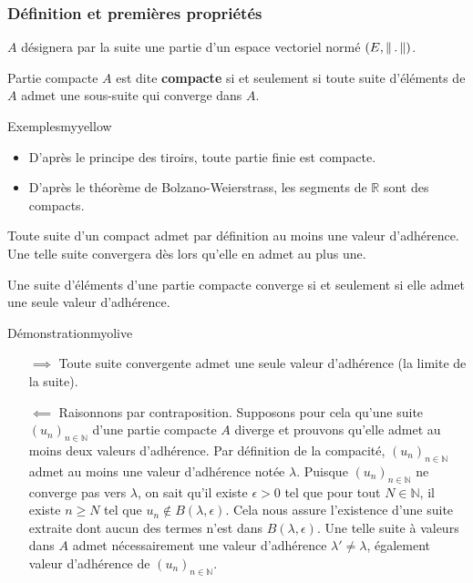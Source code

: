    \subsubsection{Définition et premières propriétés}

    $A$ désignera par la suite une partie d’un espace vectoriel normé $\left(E, \left\lVert\,.\,\right\rVert\right)$.

    \begin{defi}{Partie compacte}{}
        $A$ est dite \textbf{compacte} si et seulement si toute suite d’éléments de $A$ admet une sous-suite qui converge dans $A$.
    \end{defi}

    \begin{omed}{Exemples}{myyellow}
        \begin{itemize}
            \item D’après le principe des tiroirs, toute partie finie est compacte.
            \item D’après le théorème de Bolzano-Weierstrass, les segments de $\mathbb{R}$ sont des compacts.
        \end{itemize}
    \end{omed}

    Toute suite d’un compact admet par définition au moins une valeur d’adhérence. Une telle suite convergera dès lors qu’elle en admet au plus une.

    \begin{prop}{}{}
        Une suite d’éléments d’une partie compacte converge si et seulement si elle admet une seule valeur d’adhérence.
    \end{prop}

    \begin{demo}{Démonstration}{myolive}
        \begin{itemize}
            \item[$\implies$] Toute suite convergente admet une seule valeur d’adhérence (la limite de la suite).
            \item[$\impliedby$] Raisonnons par contraposition. Supposons pour cela qu’une suite $(u_n)_{n \in \mathbb{N}}$ d’une partie compacte $A$ diverge et prouvons qu’elle admet au moins deux valeurs d’adhérence. Par définition de la compacité, $(u_n)_{n \in \mathbb{N}}$ admet au moins une valeur d’adhérence notée $\lambda$. Puisque $(u_n)_{n \in \mathbb{N}}$ ne converge pas vers $\lambda$, on sait qu’il existe $\epsilon > 0$ tel que pour tout $N \in \mathbb{N}$, il existe $n \geq N$ tel que $u_n \notin B(\lambda,\epsilon)$. Cela nous assure l’existence d’une suite extraite dont aucun des termes n’est dans $B(\lambda,\epsilon)$. Une telle suite à valeurs dans $A$ admet nécessairement une valeur d’adhérence $\lambda' \neq \lambda$, également valeur d’adhérence de $(u_n)_{n \in \mathbb{N}}$. 
        \end{itemize}
    \end{demo}

